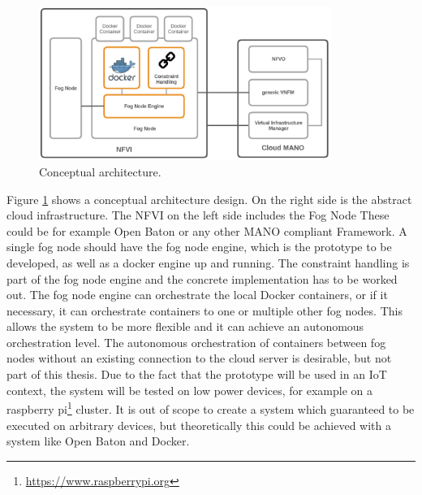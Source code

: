 \begin{figure}[H]
    \centering
    \includegraphics[width=0.85\textwidth]{resources/images/conceptual_architecture.png}
    \caption[Conceptual architecture]{Conceptual architecture.}
    \label{fig:conceptual_architecture}
\end{figure}

Figure \ref{fig:conceptual_architecture} shows a conceptual architecture design.
On the right side is the abstract cloud infrastructure.
The \ac{NFVI} on the left side includes the Fog Node
These could be for example Open Baton or any other \ac{MANO} compliant Framework.
A single fog node should have the fog node engine, which is the prototype to be developed, as well as a docker engine up and running.
The constraint handling is part of the fog node engine and the concrete implementation has to be worked out.
The fog node engine can orchestrate the local Docker containers, or if it necessary, it can orchestrate containers to one or multiple other fog nodes.
This allows the system to be more flexible and it can achieve an autonomous orchestration level.
The autonomous orchestration of containers between fog nodes without an existing connection to the cloud server is desirable, but not part of this thesis.
Due to the fact that the prototype will be used in an \ac{IoT} context, the system will be tested on low power devices, for example on a raspberry pi\footnote{\url{https://www.raspberrypi.org}} cluster.
It is out of scope to create a system which guaranteed to be executed on arbitrary devices, but theoretically this could be achieved with a system like Open Baton and Docker.


